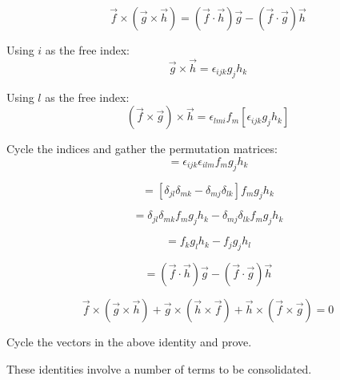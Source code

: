 \begin{question}
$$\vec{f} \times \left( \vec{g} \times\vec{h} \right) = \left( \vec{f} \cdot \vec{h} \right) \vec{g} - \left( \vec{f} \cdot\vec{g} \right) \vec{h}$$
\end{question}
\begin{solution}[print]

Using $i$ as the free index:
$$ \vec{g} \times \vec{h} = \epsilon_{ijk} g_j h_k $$

Using $l$ as the free index:
$$ \left( \vec{f} \times \vec{g} \right) \times \vec{h} = \epsilon_{lmi} f_m \left[ \epsilon_{ijk} g_j h_k \right] $$

Cycle the indices and gather the permutation matrices:
$$ = \epsilon_{ijk} \epsilon_{ilm} f_m g_j h_k $$

$$ = \left[ \delta_{jl} \delta_{mk}  - \delta_{mj} \delta_{lk} \right] f_m g_j h_k $$

$$ = \delta_{jl} \delta_{mk}  f_m g_j h_k - \delta_{mj} \delta_{lk} f_m g_j h_k $$

$$ = f_k g_l h_k - f_j g_j h_l $$

$$ = \left( \vec{f} \cdot \vec{h} \right) \vec{g} - \left( \vec{f} \cdot \vec{g} \right) \vec{h} $$

\end{solution}


\begin{question}
$$ \vec{f} \times \left( \vec{g} \times \vec{h} \right)
+ \vec{g} \times \left( \vec{h} \times \vec{f} \right)
+ \vec{h} \times \left( \vec{f} \times \vec{g} \right) = 0 $$
\end{question}
\begin{solution}[print]
Cycle the vectors in the above identity and prove.
\end{solution}


These identities involve a number of terms to be consolidated.



